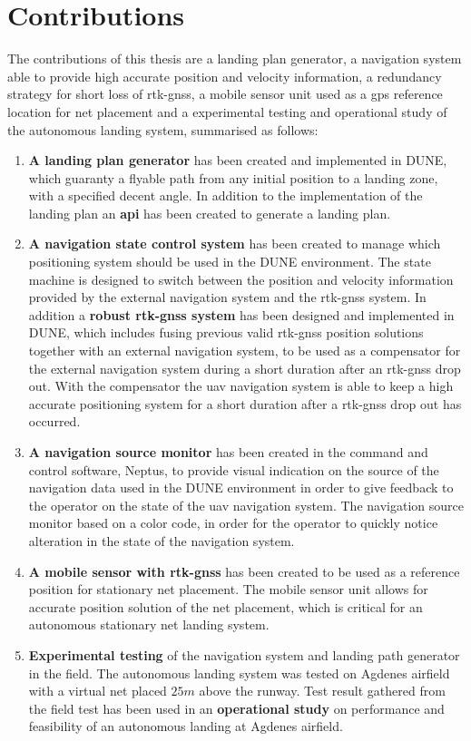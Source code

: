 \section{Contributions}
The contributions of this thesis are a landing plan generator, a navigation system able to provide high accurate position and velocity information, a redundancy strategy for short loss of \gls{rtk-gnss}, a mobile sensor unit used as a \gls{gps} reference location for net placement and a experimental testing and operational study of the autonomous landing system, summarised as follows:
\begin{enumerate}
\item \textbf{A landing plan generator} has been created and implemented in DUNE, which guaranty a flyable path from any initial position to a landing zone, with a specified decent angle. In addition to the implementation of the landing plan an \textbf{\gls{api}} has been created to generate a landing plan.
\item \textbf{A navigation state control system} has been created to manage which positioning system should be used in the DUNE environment. The state machine is designed to switch between the position and velocity information provided by the external navigation system and the \gls{rtk-gnss} system. In addition a \textbf{robust \gls{rtk-gnss} system} has been designed and implemented in DUNE, which includes fusing previous valid \gls{rtk-gnss} position solutions together with an external navigation system, to be used as a compensator for the external navigation system during a short duration after an \gls{rtk-gnss} drop out. With the compensator the \gls{uav} navigation system is able to keep a high accurate positioning system for a short duration after a \gls{rtk-gnss} drop out has occurred.
\item \textbf{A navigation source monitor} has been created in the command and control software, Neptus, to provide visual indication on the source of the navigation data used in the DUNE environment in order to give feedback to the operator on the state of the \gls{uav} navigation system. The navigation source monitor based on a color code, in order for the operator to quickly notice alteration in the state of the navigation system.
\item \textbf{A mobile sensor with \gls{rtk-gnss}} has been created to be used as a reference position for stationary net placement. The mobile sensor unit allows for accurate position solution of the net placement, which is critical for an autonomous stationary net landing system.
\item \textbf{Experimental testing} of the navigation system and landing path generator in the field. The autonomous landing system was tested on Agdenes airfield with a virtual net placed $25 m$ above the runway. Test result gathered from the field test has been used in an \textbf{operational study} on performance and  feasibility of an autonomous landing at Agdenes airfield.
\end{enumerate}
